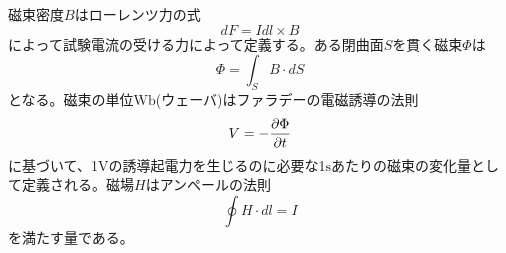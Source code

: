     磁束密度$B$はローレンツ力の式
        \[dF = Idl \times B\]
    によって試験電流の受ける力によって定義する。ある閉曲面$S$を貫く磁束$\Phi$は
        \[\Phi = \int_S B \cdot dS\]
    となる。磁束の単位$\mathrm{Wb}$(ウェーバ)はファラデーの電磁誘導の法則
        \[V = -\pd[\Phi]{t}\]
    に基づいて、1$\mathrm{V}$の誘導起電力を生じるのに必要な1$\mathrm{s}$あたりの磁束の変化量として定義される。磁場$H$はアンペールの法則
        \[\oint H \cdot dl = I\]
    を満たす量である。